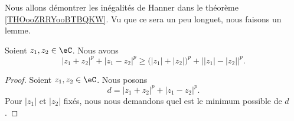 Nous allons démontrer les inégalités de Hanner dans le théorème \ref{THOooZRRYooBTBQKW}. Vu que ce sera un peu longuet, nous faisons un lemme.
\begin{lemma}       \label{LEMooDHRCooQiSpyC}
    Soient \( z_1,z_2\in \eC\). Nous avons
    \begin{equation}        \label{EQooMUXVooSpGSyG}
        | z_1+z_2 |^p+| z_1-z_2 |^p\geq \big( | z_1 |+| z_2 | \big)^p+\big| | z_1 |-| z_2 | \big|^p.
    \end{equation}
\end{lemma}

\begin{proof}
    Soient \( z_1,z_2\in \eC\). Nous posons
    \begin{equation}        \label{EQooJKYZooFzbETG}
        d=| z_1+z_2 |^p+| z_1-z_2 |^p.
    \end{equation}
    Pour \( | z_1 |\) et \( | z_2 |\) fixés, nous nous demandons quel est le minimum possible de \( d\).


\end{proof}
